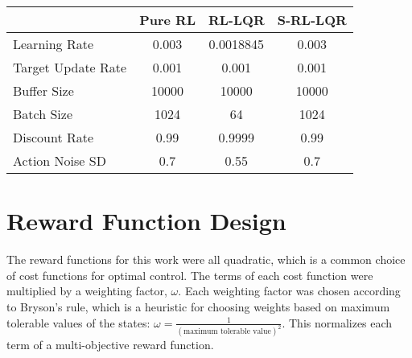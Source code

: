 \begin{table}[H]
    \centering
    \begin{tabular}{l c c c}
        & Pure RL & RL-LQR & S-RL-LQR \\
        \hline
        Learning Rate & 0.003 & 0.0018845 & 0.003 \\
        Target Update Rate & 0.001 & 0.001 & 0.001  \\
        Buffer Size & 10000 & 10000 & 10000 \\
        Batch Size & 1024 & 64 & 1024 \\
        Discount Rate & 0.99 & 0.9999 & 0.99 \\
        Action Noise SD & 0.7 & 0.55 & 0.7 \\
    \end{tabular}
\end{table}

\section*{Reward Function Design}

The reward functions for this work were all quadratic, which is a common choice of cost functions for optimal control. The terms of each cost function were multiplied by a weighting factor, $\omega$. Each weighting factor was chosen according to Bryson's rule, which is a heuristic for choosing weights based on maximum tolerable values of the states: $\omega=\frac{1}{(\text{maximum tolerable value})^2}$. This normalizes each term of a multi-objective reward function.
%
